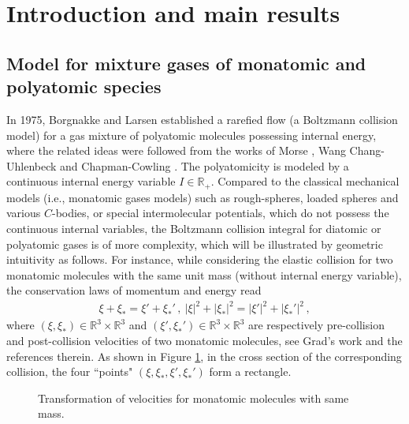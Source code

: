 \documentclass[reqno,11pt]{amsart}
\numberwithin{equation}{section}
\def\R{\mathbb{R}}
\begin{document}
\section{Introduction and main results}

\subsection{Model for mixture gases of monatomic and polyatomic species}

In 1975, Borgnakke and Larsen \cite{Borgnakke-Larsen-JCP-1975} established a rarefied flow (a Boltzmann collision model) for a gas mixture of polyatomic molecules possessing internal energy, where the related ideas were followed from the works of Morse \cite{Morse-PF-1964}, Wang Chang-Uhlenbeck \cite{Wang-Uhlenbeck-1951} and Chapman-Cowling \cite{Chapman-Cowling-1960}. The polyatomicity is modeled by a continuous internal energy variable $I \in \R_+$. Compared to the classical mechanical models (i.e., monatomic gases models) such as rough-spheres, loaded spheres and various $C$-bodies, or special intermolecular potentials, which do not possess the continuous internal variables, the Boltzmann collision integral for diatomic or polyatomic gases is of more complexity, which will be illustrated by geometric intuitivity as follows. For instance, while considering the elastic collision for two monatomic molecules with the same unit mass (without internal energy variable), the conservation laws of momentum and energy read
\begin{equation*}
	\begin{aligned}
		\xi + \xi_* = \xi' + \xi_*' \,, \ |\xi|^2 + |\xi_*|^2 = |\xi'|^2 + |\xi_*'|^2 \,,
	\end{aligned}
\end{equation*}
where $(\xi, \xi_*) \in \R^3 \times \R^3$ and $(\xi', \xi_*') \in \R^3 \times \R^3$ are respectively pre-collision and post-collision velocities of two monatomic molecules, see Grad's work \cite{Grad-cut-off} and the references therein. As shown in Figure \ref{Fig1}, in the cross section of the corresponding collision, the four ``points" $(\xi, \xi_*, \xi', \xi_*')$ form a rectangle.
\begin{figure}[h]
	\begin{center}
	\end{center}
	\caption{Transformation of velocities for monatomic molecules with same mass.}\label{Fig1}
\end{figure}
\end{document}
